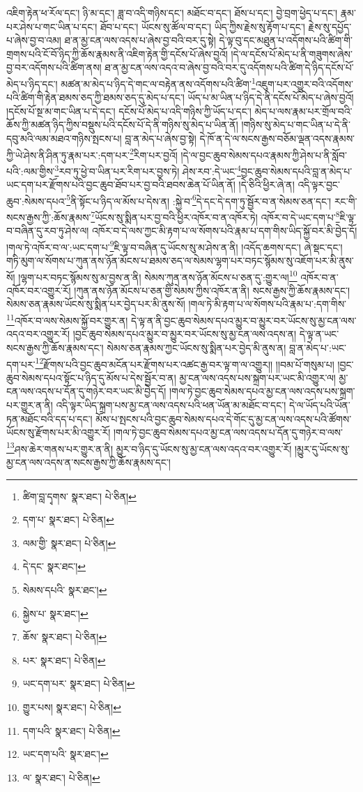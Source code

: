 འཇིག་རྟེན་ཕ་རོལ་དང་། ཉི་མ་དང་། ཟླ་བ་འདི་གཉིས་དང་། མཐོང་བ་དང་། ཐོས་པ་དང་། བྱེ་བྲག་ཕྱེད་པ་དང་། རྣམ་པར་ཤེས་པ་གང་ཡིན་པ་དང་། ཐོབ་པ་དང་། ཡོངས་སུ་ཚོལ་བ་དང་། ཡིད་ཀྱིས་རྗེས་སུ་རྟོག་པ་དང་། རྗེས་སུ་དཔྱོད་པ་ཞེས་བྱ་བ་འམ། ཐ་ན་མྱ་ངན་ལས་འདས་པ་ཞེས་བྱ་བའི་བར་དུ་སྟེ། དེ་ལྟ་བུ་དང་མཐུན་པ་འདོགས་པའི་ཚིག་གི་གྲགས་པའི་ངོ་བོ་ཉིད་ཀྱི་ཆོས་རྣམས་ནི་འཇིག་རྟེན་གྱི་དངོས་པོ་ཞེས་བྱའོ། །དེ་ལ་དངོས་པོ་མེད་པ་ནི་གཟུགས་ཞེས་བྱ་བར་འདོགས་པའི་ཚིག་ནས། ཐ་ན་མྱ་ངན་ལས་འདའ་བ་ཞེས་བྱ་བའི་བར་དུ་འདོགས་པའི་ཚིག་དེ་ཉིད་དངོས་པོ་མེད་པ་ཉིད་དང་། མཚན་མ་མེད་པ་ཉིད་དེ་གང་ལ་བརྟེན་ནས་འདོགས་པའི་ཚིག་\footnote{ཚིག་བླ་དྭགས་  སྣར་ཐང་།  པེ་ཅིན། }འཇུག་པར་འགྱུར་བའི་འདོགས་པའི་ཚིག་གི་རྟེན་ཐམས་ཅད་ཀྱི་ཐམས་ཅད་དུ་མེད་པ་དང་། ཡོད་པ་མ་ཡིན་པ་ཉིད་དེ་ནི་དངོས་པོ་མེད་པ་ཞེས་བྱའོ། །དངོས་པོ་སྔ་མ་གང་ཡིན་པ་དེ་དང་། དངོས་པོ་མེད་པ་འདི་གཉིས་ཀྱི་ཡོད་པ་དང་། མེད་པ་ལས་རྣམ་པར་གྲོལ་བའི་ཆོས་ཀྱི་མཚན་ཉིད་ཀྱིས་བསྡུས་པའི་དངོས་པོ་དེ་ནི་གཉིས་སུ་མེད་པ་ཡིན་ནོ། །གཉིས་སུ་མེད་པ་གང་ཡིན་པ་དེ་ནི་དབུ་མའི་ལམ་མཐའ་གཉིས་སྤངས་པ། བླ་ན་མེད་པ་ཞེས་བྱ་སྟེ། དེ་ཁོ་ན་དེ་ལ་སངས་རྒྱས་བཅོམ་ལྡན་འདས་རྣམས་ཀྱི་ཡེ་ཤེས་ནི་ཤིན་ཏུ་རྣམ་པར་:དག་པར་\footnote{དག་པ་  སྣར་ཐང་།  པེ་ཅིན། }རིག་པར་བྱའོ། །དེ་ལ་བྱང་ཆུབ་སེམས་དཔའ་རྣམས་ཀྱི་ཤེས་པ་ནི་སློབ་པའི་:ལམ་གྱིས་\footnote{ལམ་གྱི་  སྣར་ཐང་།  པེ་ཅིན། }རབ་ཏུ་ཕྱེ་བ་ཡིན་པར་རིག་པར་བྱས་ཏེ། ཤེས་རབ་:དེ་ཡང་\footnote{དེ་དང་  སྣར་ཐང་། }བྱང་ཆུབ་སེམས་དཔའི་བླ་ན་མེད་པ་ཡང་དག་པར་རྫོགས་པའི་བྱང་ཆུབ་ཐོབ་པར་བྱ་བའི་ཐབས་ཆེན་པོ་ཡིན་ནོ། །དེ་ཅིའི་ཕྱིར་ཞེ་ན། འདི་ལྟར་བྱང་ཆུབ་:སེམས་དཔའ་\footnote{སེམས་དཔའི་  སྣར་ཐང་། }ནི་སྟོང་པ་ཉིད་ལ་མོས་པ་དེས་ན། :སྐྱེ་བ་\footnote{སྐྱེས་པ་  སྣར་ཐང་། }དེ་དང་དེ་དག་ཏུ་སྦྱོར་བ་ན་སེམས་ཅན་དང་། རང་གི་སངས་རྒྱས་ཀྱི་:ཆོས་རྣམས་\footnote{ཆོས་  སྣར་ཐང་།  པེ་ཅིན། }ཡོངས་སུ་སྨིན་པར་བྱ་བའི་ཕྱིར་འཁོར་བ་ན་འཁོར་ཏེ། འཁོར་བ་དེ་ཡང་དག་པ་\footnote{པར་  སྣར་ཐང་།  པེ་ཅིན། }ཇི་ལྟ་བ་བཞིན་དུ་རབ་ཏུ་ཤེས་ལ། འཁོར་བ་དེ་ལས་ཀྱང་མི་རྟག་པ་ལ་སོགས་པའི་རྣམ་པ་དག་གིས་ཡིད་སྐྱོ་བར་མི་བྱེད་དོ། །གལ་ཏེ་འཁོར་བ་ལ་:ཡང་དག་པ་\footnote{ཡང་དག་པར་  སྣར་ཐང་།  པེ་ཅིན། }ཇི་ལྟ་བ་བཞིན་དུ་ཡོངས་སུ་མ་ཤེས་ན་ནི། །འདོད་ཆགས་དང་། ཞེ་སྡང་དང་། གཏི་མུག་ལ་སོགས་པ་ཀུན་ནས་ཉོན་མོངས་པ་ཐམས་ཅད་ལ་སེམས་ལྷག་པར་བཏང་སྙོམས་སུ་འཇོག་པར་མི་ནུས་སོ། །ལྷག་པར་བཏང་སྙོམས་སུ་མ་བྱས་ན་ནི། སེམས་ཀུན་ནས་ཉོན་མོངས་པ་ཅན་དུ་:གྱུར་ལ།\footnote{གྱུར་པས།  སྣར་ཐང་།  པེ་ཅིན། } འཁོར་བ་ན་འཁོར་བར་འགྱུར་རོ། །ཀུན་ནས་ཉོན་མོངས་པ་ཅན་གྱི་སེམས་ཀྱིས་འཁོར་ན་ནི། སངས་རྒྱས་ཀྱི་ཆོས་རྣམས་དང་། སེམས་ཅན་རྣམས་ཡོངས་སུ་སྨིན་པར་བྱེད་པར་མི་ནུས་སོ། །གལ་ཏེ་མི་རྟག་པ་ལ་སོགས་པའི་རྣམ་པ་:དག་གིས་\footnote{དག་པའི་  སྣར་ཐང་།  པེ་ཅིན། }འཁོར་བ་ལས་སེམས་སྐྱོ་བར་གྱུར་ན། དེ་ལྟ་ན་ནི་བྱང་ཆུབ་སེམས་དཔའ་མྱུར་བ་མྱུར་བར་ཡོངས་སུ་མྱ་ངན་ལས་འདའ་བར་འགྱུར་རོ། །བྱང་ཆུབ་སེམས་དཔའ་མྱུར་བ་མྱུར་བར་ཡོངས་སུ་མྱ་ངན་ལས་འདས་ན། དེ་ལྟ་ན་ཡང་སངས་རྒྱས་ཀྱི་ཆོས་རྣམས་དང་། སེམས་ཅན་རྣམས་ཀྱང་ཡོངས་སུ་སྨིན་པར་བྱེད་མི་ནུས་ན། བླ་ན་མེད་པ་:ཡང་དག་པར་\footnote{ཡང་དག་པའི་  སྣར་ཐང་། }རྫོགས་པའི་བྱང་ཆུབ་མངོན་པར་རྫོགས་པར་འཚང་རྒྱ་བར་ལྟ་ག་ལ་འགྱུར།། །།བམ་པོ་གསུམ་པ། །བྱང་ཆུབ་སེམས་དཔའ་སྟོང་པ་ཉིད་དུ་མོས་པ་དེས་སྦྱོར་བ་ན། མྱ་ངན་ལས་འདས་པས་སྐྲག་པར་ཡང་མི་འགྱུར་ལ། མྱ་ངན་ལས་འདས་པ་དོན་དུ་གཉེར་བར་ཡང་མི་བྱེད་དོ། །གལ་ཏེ་བྱང་ཆུབ་སེམས་དཔའ་མྱ་ངན་ལས་འདས་པས་སྐྲག་པར་གྱུར་ན་ནི། འདི་ལྟར་ཡིད་སྐྲག་པས་མྱ་ངན་ལས་འདས་པའི་ཕན་ཡོན་མ་མཐོང་བ་དང་། དེ་ལ་ཡོད་པའི་ཡོན་ཏན་མཐོང་བའི་དད་པ་དང་། མོས་པ་སྤངས་པའི་བྱང་ཆུབ་སེམས་དཔའ་དེ་གོང་དུ་མྱ་ངན་ལས་འདས་པའི་ཚོགས་ཡོངས་སུ་རྫོགས་པར་མི་འགྱུར་རོ། །གལ་ཏེ་བྱང་ཆུབ་སེམས་དཔའ་མྱ་ངན་ལས་འདས་པ་དོན་དུ་གཉེར་བ་ལས་\footnote{ལ་  སྣར་ཐང་།  པེ་ཅིན། }ཤས་ཆེར་གནས་པར་གྱུར་ན་ནི། མྱུར་བ་ཉིད་དུ་ཡོངས་སུ་མྱ་ངན་ལས་འདའ་བར་འགྱུར་རོ། །མྱུར་དུ་ཡོངས་སུ་མྱ་ངན་ལས་འདས་ན་སངས་རྒྱས་ཀྱི་ཆོས་རྣམས་དང་། 